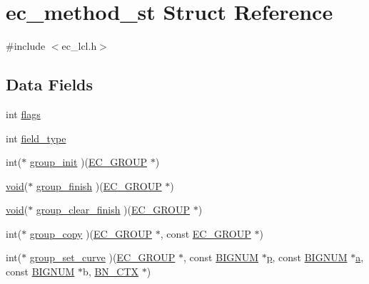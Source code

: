 \hypertarget{structec__method__st}{}\section{ec\+\_\+method\+\_\+st Struct Reference}
\label{structec__method__st}


{\ttfamily \#include $<$ec\+\_\+lcl.\+h$>$}

\subsection*{Data Fields}
\begin{DoxyCompactItemize}
\item 
int \hyperlink{structec__method__st_ac8bf36fe0577cba66bccda3a6f7e80a4}{flags}
\item 
int \hyperlink{structec__method__st_a3337f4880bc9779ef468d0c0cbdf8e3b}{field\+\_\+type}
\item 
int($\ast$ \hyperlink{structec__method__st_a60946752e9d89a6161e8bc95b31adaac}{group\+\_\+init} )(\hyperlink{crypto_2ec_2ec_8h_aca3c2dfa5546740e0f575013960a598a}{E\+C\+\_\+\+G\+R\+O\+UP} $\ast$)
\item 
\hyperlink{hw__4758__cca_8h_afad4d591c7931ff6dc5bf69c76c96aa0}{void}($\ast$ \hyperlink{structec__method__st_a11e6826f1cca4d2e125c48c3c961fdab}{group\+\_\+finish} )(\hyperlink{crypto_2ec_2ec_8h_aca3c2dfa5546740e0f575013960a598a}{E\+C\+\_\+\+G\+R\+O\+UP} $\ast$)
\item 
\hyperlink{hw__4758__cca_8h_afad4d591c7931ff6dc5bf69c76c96aa0}{void}($\ast$ \hyperlink{structec__method__st_a2e94b107ad47227ce8c663fa2ec0da02}{group\+\_\+clear\+\_\+finish} )(\hyperlink{crypto_2ec_2ec_8h_aca3c2dfa5546740e0f575013960a598a}{E\+C\+\_\+\+G\+R\+O\+UP} $\ast$)
\item 
int($\ast$ \hyperlink{structec__method__st_af268d3033c6aa6a1349ca493e1aeec86}{group\+\_\+copy} )(\hyperlink{crypto_2ec_2ec_8h_aca3c2dfa5546740e0f575013960a598a}{E\+C\+\_\+\+G\+R\+O\+UP} $\ast$, const \hyperlink{crypto_2ec_2ec_8h_aca3c2dfa5546740e0f575013960a598a}{E\+C\+\_\+\+G\+R\+O\+UP} $\ast$)
\item 
int($\ast$ \hyperlink{structec__method__st_a5941d4f307f38861f005688e0f818ecf}{group\+\_\+set\+\_\+curve} )(\hyperlink{crypto_2ec_2ec_8h_aca3c2dfa5546740e0f575013960a598a}{E\+C\+\_\+\+G\+R\+O\+UP} $\ast$, const \hyperlink{crypto_2ossl__typ_8h_a6fb19728907ec6515e4bfb716bffa141}{B\+I\+G\+N\+UM} $\ast$\hyperlink{ssl__locl_8h_a4014c6f4a6fa0e565ca592bcaca0fa58}{p}, const \hyperlink{crypto_2ossl__typ_8h_a6fb19728907ec6515e4bfb716bffa141}{B\+I\+G\+N\+UM} $\ast$\hyperlink{hpux_8cc_af3e37283d97a42ffc096d8958a745f32}{a}, const \hyperlink{crypto_2ossl__typ_8h_a6fb19728907ec6515e4bfb716bffa141}{B\+I\+G\+N\+UM} $\ast$b, \hyperlink{crypto_2ossl__typ_8h_a0b235a35b7dd7922c097571ecd90e2bc}{B\+N\+\_\+\+C\+TX} $\ast$)

\end{DoxyCompactItemize}
